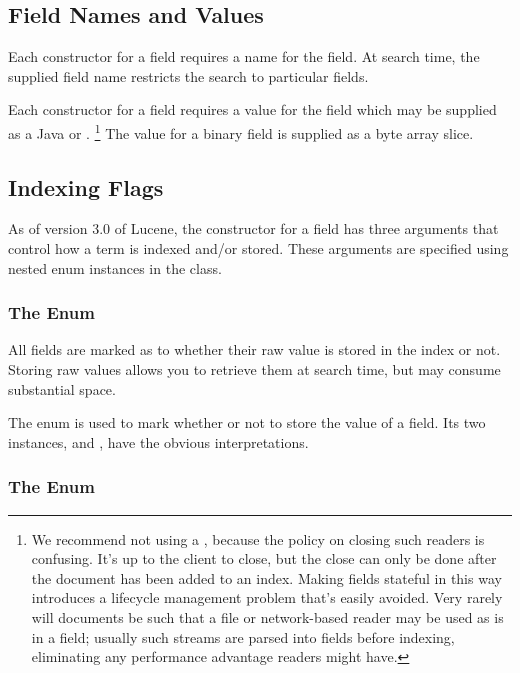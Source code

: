 \subsection{Field Names and Values}

Each constructor for a field requires a name for the field.  At search
time, the supplied field name restricts the search to particular
fields.  

Each constructor for a field requires a value for the field
which may be supplied as a Java  or .%
%
\footnote{We recommend not using a , because the policy
  on closing such readers is confusing.  It's up to the client to
  close, but the close can only be done after the document has been
  added to an index.  Making fields stateful in this way introduces a
  lifecycle management problem that's easily avoided.  Very rarely
  will documents be such that a file or network-based reader may be
  used as is in a field; usually such streams are parsed into fields
  before indexing, eliminating any performance advantage readers might
  have.}
%
The value for a binary field is supplied as a byte array slice.


\subsection{Indexing Flags}

As of version 3.0 of Lucene, the constructor for a field has three
arguments that control how a term is indexed and/or stored.  These
arguments are specified using nested enum instances in the
 class.

\subsubsection{The  Enum}

All fields are marked as to whether their raw value is stored in the
index or not.  Storing raw values allows you to retrieve them at
search time, but may consume substantial space.  

The enum  is used to mark whether or not to store
the value of a field.  Its two instances,  and
, have the obvious interpretations.

\subsubsection{The  Enum}

